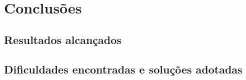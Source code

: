 \section{Conclusões}

\subsection{Resultados alcançados}
\subsection{Dificuldades encontradas e soluções adotadas}